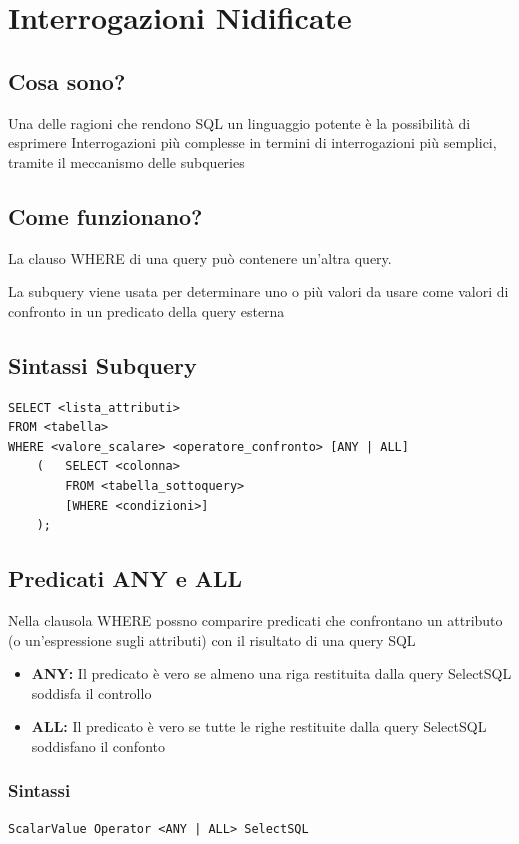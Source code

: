 \chapter{Interrogazioni Nidificate}
\section{Cosa sono?}
Una delle ragioni che rendono SQL un linguaggio potente è la possibilità di esprimere Interrogazioni più complesse in termini di interrogazioni più semplici, tramite il meccanismo delle subqueries

\section{Come funzionano?}
La clauso WHERE di una query può contenere un'altra query.

La subquery viene usata per determinare uno o più valori da usare come valori di confronto in un predicato della query esterna

\section{Sintassi Subquery}
\begin{lstlisting}[language=sql_generic]
SELECT <lista_attributi>
FROM <tabella>
WHERE <valore_scalare> <operatore_confronto> [ANY | ALL] 
    (   SELECT <colonna> 
        FROM <tabella_sottoquery> 
        [WHERE <condizioni>] 
    );
\end{lstlisting}

\section{Predicati ANY e ALL}
Nella clausola WHERE possno comparire predicati che confrontano un attributo (o un'espressione sugli attributi) con il risultato di una query SQL

\begin{itemize}
    \item \textbf{ANY:} Il predicato è vero se almeno una riga restituita dalla query SelectSQL soddisfa il controllo
    \item \textbf{ALL:} Il predicato è vero se tutte le righe restituite dalla query SelectSQL soddisfano il confonto
\end{itemize}

\subsection{Sintassi}
\begin{lstlisting}[language=sql_generic]
ScalarValue Operator <ANY | ALL> SelectSQL
\end{lstlisting}

